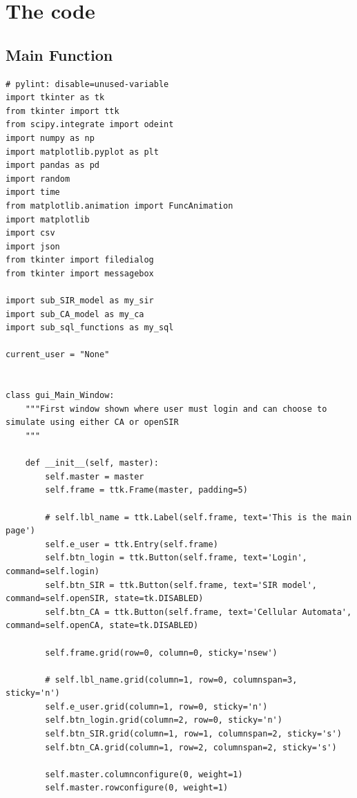 \documentclass[11pt, a4paper]{article}
\begin{document}

\newpage
\section{The code}


\subsection{Main Function}
\begin{lstlisting}
# pylint: disable=unused-variable
import tkinter as tk
from tkinter import ttk
from scipy.integrate import odeint
import numpy as np
import matplotlib.pyplot as plt
import pandas as pd
import random
import time
from matplotlib.animation import FuncAnimation
import matplotlib
import csv
import json
from tkinter import filedialog
from tkinter import messagebox

import sub_SIR_model as my_sir
import sub_CA_model as my_ca
import sub_sql_functions as my_sql

current_user = "None"


class gui_Main_Window:
    """First window shown where user must login and can choose to simulate using either CA or openSIR
    """

    def __init__(self, master):
        self.master = master
        self.frame = ttk.Frame(master, padding=5)

        # self.lbl_name = ttk.Label(self.frame, text='This is the main page')
        self.e_user = ttk.Entry(self.frame)
        self.btn_login = ttk.Button(self.frame, text='Login', command=self.login)
        self.btn_SIR = ttk.Button(self.frame, text='SIR model', command=self.openSIR, state=tk.DISABLED)
        self.btn_CA = ttk.Button(self.frame, text='Cellular Automata', command=self.openCA, state=tk.DISABLED)

        self.frame.grid(row=0, column=0, sticky='nsew')

        # self.lbl_name.grid(column=1, row=0, columnspan=3, sticky='n')
        self.e_user.grid(column=1, row=0, sticky='n')
        self.btn_login.grid(column=2, row=0, sticky='n')
        self.btn_SIR.grid(column=1, row=1, columnspan=2, sticky='s')
        self.btn_CA.grid(column=1, row=2, columnspan=2, sticky='s')

        self.master.columnconfigure(0, weight=1)
        self.master.rowconfigure(0, weight=1)


\end{lstlisting}
\end{document}
